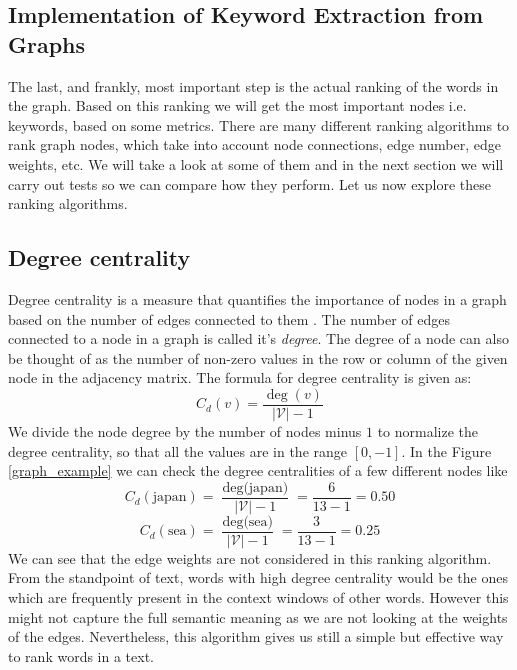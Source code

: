 \documentclass[12pt]{article}
\numberwithin{equation}{section}
\begin{document}
\begin{spacing}{1.5}
	\newpage
	\section{Implementation of Keyword Extraction from Graphs}
	The last, and frankly, most important step is the actual ranking of the words in the graph. Based on this ranking we will get the most important nodes i.e. keywords, based on some metrics. There are many different ranking algorithms to rank graph nodes, which take into account node connections, edge number, edge weights, etc. We will take a look at some of them and in the next section we will carry out tests so we can compare how they perform. Let us now explore these ranking algorithms.
	\subsection{Degree centrality}
	Degree centrality is a measure that quantifies the importance of nodes in a graph based on the number of edges connected to them \cite{networkx_centrality}. The number of edges connected to a node in a graph is called it's \textit{degree}. The degree of a node can also be thought of as the number of non-zero values in the row or column of the given node in the adjacency matrix. The formula for degree centrality is given as:
	\begin{equation}
		C_d(v) = \frac{\deg(v)}{|\mathcal{V}|-1}
	\end{equation}
	We divide the node degree by the number of nodes minus $1$ to normalize the degree centrality, so that all the values are in the range $[0, -1]$. In the Figure \ref{graph_example} we can check the degree centralities of a few different nodes like 
	$$C_d(\text{japan}) = \frac{\deg\text{(japan)}}{|\mathcal{V}|-1} = \frac{6}{13-1} = 0.50$$
	$$C_d(\text{sea}) = \frac{\deg\text{(sea)}}{|\mathcal{V}|-1} = \frac{3}{13-1} = 0.25$$
	We can see that the edge weights are not considered in this ranking algorithm. From the standpoint of text, words with high degree centrality would be the ones which are frequently present in the context windows of other words. However this might not capture the full semantic meaning as we are not looking at the weights of the edges. Nevertheless, this algorithm gives us still a simple but effective way to rank words in a text. 	
	

\end{spacing}
\end{document}
